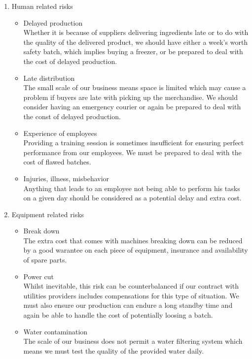 \documentclass[11pt]{article}
\begin{document}
  \begin{enumerate}
  \item Human related risks
    \begin{itemize}
    \item Delayed production \\ Whether it is because of suppliers delivering ingredients late or to do with the quality of the delivered product, we should have either a week's worth safety batch, which implies buying a freezer, or be prepared to deal with the cost of delayed production.
    \item Late distribution \\
The small scale of our business means space is limited which may cause a problem if buyers are late with picking up the merchandise. We should consider having an emergency courier  or again be prepared to deal with the const of delayed production.
    \item Experience of employees \\
Providing a training session is sometimes insufficient for ensuring perfect performance from our employees. We must be prepared to deal with the cost of flawed batches.
    \item Injuries, illness, misbehavior \\
Anything that leads to an employee not being able to perform his tasks on a given day should be considered as a potential delay and extra cost.
    \end{itemize}

  \item Equipment related risks
    \begin{itemize}
    \item Break down \\
The extra cost that comes with machines breaking down can be reduced by a good warantee on each piece of equipment, insurance and availability of spare parts.
    \item Power cut \\
Whilst inevitable, this risk can be counterbalanced if our contract with utilities providers includes compensations for this type of situation. We must also ensure our production can endure a long standby time and again be able to handle the cost of potentially loosing a batch.
    \item Water contamination \\
The scale of our business does not permit a water filtering system which means we must test the quality of the provided water daily.
    \end{itemize}


\end{enumerate}
\end{document}
